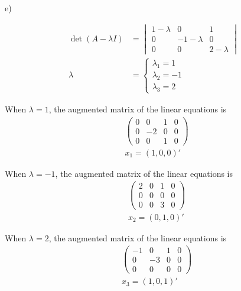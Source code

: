 \documentclass[letterpaper, 11pt]{article}
\newcommand{\1}{\mathds{1}}	%
\theoremstyle{definition}
\begin{document}
e)

\begin{align*}
    \det (A-\lambda I) & = \begin{vmatrix}
                               1-\lambda & 0          & 1         \\
                               0         & -1-\lambda & 0         \\
                               0         & 0          & 2-\lambda
                           \end{vmatrix} \\
    \lambda            & = \left\{\begin{array}{l}
                                      \lambda_{1} = 1  \\
                                      \lambda_{2} = -1 \\
                                      \lambda_{3} = 2
                                  \end{array}\right.
\end{align*}

When $\lambda = 1$, the augmented matrix of the linear equations is \begin{align*}
     & \left(\begin{array}{ccc|c}
                     0 & 0  & 1 & 0 \\
                     0 & -2 & 0 & 0 \\
                     0 & 0  & 1 & 0
                 \end{array}\right) \\
     & x_{1} = (1,0,0)'
\end{align*}

When $\lambda=-1$, the augmented matrix of the linear equations is \begin{align*}
     & \left(\begin{array}{ccc|c}
                     2 & 0 & 1 & 0 \\
                     0 & 0 & 0 & 0 \\
                     0 & 0 & 3 & 0
                 \end{array}\right) \\
     & x_{2} = (0,1,0)'
\end{align*}

When $\lambda=2$, the augmented matrix of the linear equations is \begin{align*}
     & \left(\begin{array}{ccc|c}
                     -1 & 0  & 1 & 0 \\
                     0  & -3 & 0 & 0 \\
                     0  & 0  & 0 & 0
                 \end{array}\right) \\
     & x_{3} = (1,0,1)'
\end{align*}
\end{document}
